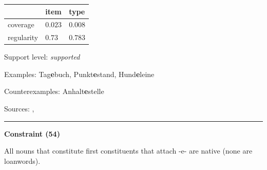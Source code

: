 \vspace{-0.25em}

\begin{table}[!ht]
\begin{center}
\setlength{\extrarowheight}{1pt}
\begin{tabularx}{\columnwidth}{|X|X|X|}
\hline
 & item & type \\
\hline
 coverage & $0.023$ & $0.008$ \\
\hline
 regularity & $0.73$ & $0.783$ \\
\hline
\end{tabularx}
\end{center}
\end{table}

\vspace{-1.35em}

\noindent
Support level: \textit{supported}

\vspace{0.3em}

\noindent
Examples: Tag\textbf{e}buch, Punkt\textbf{e}stand, Hund\textbf{e}leine

\noindent
Counterexamples: Anhalt\textbf{e}stelle

\vspace{0.3em}

\noindent
Sources: \citet[9, 18]{kuerschner_2010}, \citet[102]{ortner_mueller-bollhagen_1991}

\vspace{0.35em}
\hrule




\vspace{0.4em}

\begin{center}
\textbf{Constraint (54)}
\end{center}

\noindent
All nouns that constitute first constituents that attach -e- are native (none are loanwords).
\vspace{0.5em}


